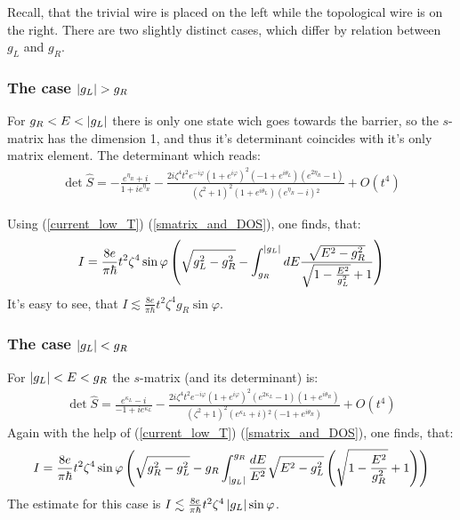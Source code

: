 Recall, that the trivial wire is placed on the left  while the topological wire is on the right. There are two slightly distinct cases, which differ by relation between $ g_L $ and $ g_R $. 
\subsubsection{The case $ \left|g_L\right| > g_R $}

For $ g_R<E<\left|g_L\right| $ there is only one state wich goes towards the barrier, so the $ s $-matrix has the dimension 1, and thus it's determinant coincides with it's only matrix element. The determinant which reads:
\begin{gather}
	\det \hat{S}
	=
	-\frac{e^{\eta _R}+i}{1+i e^{\eta _R}}-\frac{2 i \zeta ^4 t^2 e^{-i \varphi } \left(1+e^{i \varphi }\right)^2 \left(-1+e^{i \theta _L}\right) \left(e^{2 \eta _R}-1\right)}{\left(\zeta ^2+1\right)^2 \left(1+e^{i \theta _L}\right) \left(e^{\eta _R}-i\right){}^2}+O\left(t^4\right)
\end{gather}

Using (\ref{current_low_T}) (\ref{smatrix_and_DOS}), one finds, that:
\begin{gather}
\label{curr_e_between_g_r>g_l}
	I=
	\frac{8e}{\pi\hbar}t^2\zeta^4\sin\varphi
	\left(
		\sqrt{g_L^2-g_R^2}
		-
		\int_{g_R}^{\left|g_L\right|}	dE\frac{\sqrt{E^2-g_R^2}}{ \sqrt{1-\frac{E^2}{g_L^2}}+1}\right)
\end{gather}
It's easy to see, that $ I\lesssim 	\frac{8e}{\pi\hbar}t^2\zeta^4 g_{R}\sin\varphi  $.
\subsubsection{The case $ \left|g_L\right| < g_R $}
For $ \left|g_L\right|<E<g_R $  the $ s $-matrix (and its determinant) is:
\begin{gather}
\det\hat{S}
=
	\frac{e^{\kappa _L}-i}{-1+i e^{\kappa _L}}-\frac{2 i \zeta ^4 t^2 e^{-i \varphi } \left(1+e^{i \varphi }\right)^2 \left(e^{2 \kappa _L}-1\right) \left(1+e^{i \theta _R}\right)}{\left(\zeta ^2+1\right)^2 \left(e^{\kappa _L}+i\right){}^2 \left(-1+e^{i \theta _R}\right)}+O\left(t^4\right)
\end{gather}
Again with the help of (\ref{current_low_T}) (\ref{smatrix_and_DOS}), one finds, that:
\begin{gather}
\label{curr_e_between_g_r<g_l}
I=
\frac{8e}{\pi\hbar}t^2\zeta^4
\sin \varphi
\left(
	\sqrt{g_R^2-g_L^2}
	-
	g_R
	\int_{\left|g_L\right|}^{g_R}
	\frac{dE}{E^2}
	\sqrt{E^2-g_L^2} \left(\sqrt{1-\frac{E^2}{g_R^2}}+1\right)
\right)
\end{gather}
The estimate for this case is $ I\lesssim 	\frac{8e}{\pi\hbar}t^2\zeta^4 \left|g_{L}\right|\sin\varphi  $.
